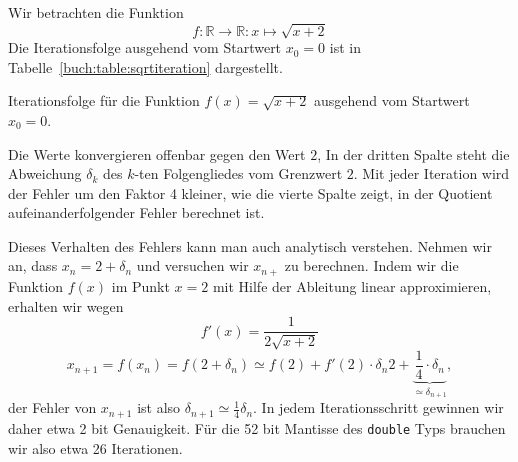 \begin{beispiel}
\label{section:beispiel:sqrtiteration}
Wir betrachten die Funktion 
\[
f\colon \mathbb{R}\to\mathbb{R} : x\mapsto \sqrt{x+2}
\]
Die Iterationsfolge ausgehend vom Startwert $x_0=0$ ist in
Tabelle~\ref{buch:table:sqrtiteration} dargestellt.

\begin{table}
\centering
\renewcommand\arraystretch{1.15}

\caption{Iterationsfolge für die Funktion $f(x)=\sqrt{x+2}$ ausgehend
vom Startwert $x_0=0$.
\label{buch:table:sqrtiteration}}
\end{table}

Die Werte konvergieren offenbar gegen den Wert $2$, 
In der dritten Spalte steht die Abweichung $\delta_k$ des $k$-ten Folgengliedes
vom Grenzwert $2$.
Mit jeder Iteration wird der Fehler um den Faktor 4 kleiner, wie die
vierte Spalte zeigt, in der Quotient aufeinanderfolgender Fehler
berechnet ist.

Dieses Verhalten des Fehlers kann man auch analytisch verstehen.
Nehmen wir an, dass $x_n = 2 + \delta_n$ und versuchen wir 
$x_{n+}$ zu berechnen.
Indem wir die Funktion $f(x)$ im Punkt $x=2$ mit Hilfe der Ableitung
linear approximieren, erhalten wir wegen
\[
f'(x) = \frac{1}{2\sqrt{x+2}}
\]
\[
x_{n+1} = f(x_n) = f(2 + \delta_n)
\simeq
f(2) + f'(2)\cdot \delta_n
2 + \underbrace{\frac14\cdot \delta_n}_{\displaystyle\simeq\delta_{n+1}},
\]
der Fehler von $x_{n+1}$ ist also $\delta_{n+1}\simeq\frac14\delta_n$.
In jedem Iterationsschritt gewinnen wir daher etwa 2 bit Genauigkeit.
Für die 52 bit Mantisse des \texttt{double} Typs brauchen wir also
etwa 26 Iterationen.
\end{beispiel}

